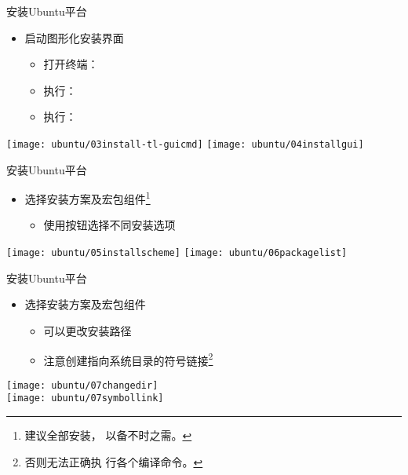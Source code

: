 \documentclass[fontset = none, t]{ctexbeamer}
\begin{document}
\begin{frame}{安装\tl}{Ubuntu平台}
  \begin{spacing}{1.0}
    \begin{itemize}
    \item 启动\tl 图形化安装界面
      \begin{itemize}
      \item 打开终端：\setmenukeyswin {}
      \item 执行：
      \item 执行：
      \end{itemize}
    \end{itemize}
  \begin{center}
    \texttt{[image: ubuntu/03install-tl-guicmd]}
    \texttt{[image: ubuntu/04installgui]}
  \end{center}
  \end{spacing}
\end{frame}

\begin{frame}{安装\tl}{Ubuntu平台}
  \begin{spacing}{1.0}
    \begin{itemize}
    \item 选择\tl 安装方案及宏包组件\footnote[frame,1]{建议全部安装，
        以备不时之需。}
      \begin{itemize}
      \item 使用按钮选择不同安装选项
      \end{itemize}
    \end{itemize}
  \begin{center}
    \texttt{[image: ubuntu/05installscheme]}
    \texttt{[image: ubuntu/06packagelist]}
  \end{center}
  \end{spacing}
\end{frame}

\begin{frame}{安装\tl}{Ubuntu平台}
  \begin{spacing}{1.0}
    \begin{itemize}
    \item 选择\tl 安装方案及宏包组件
      \begin{itemize}
      \item 可以更改安装路径
      \item 注意创建\alert{指向系统目录的符号链接}\footnote[frame,1]{否则无法正确执
        行各个编译命令。}
      \end{itemize}
    \end{itemize}
  \vspace{-2ex} 
  \begin{center}
    \texttt{[image: ubuntu/07changedir]}\\
    \texttt{[image: ubuntu/07symbollink]}
  \end{center}
  \end{spacing}
\end{frame}
\end{document}

